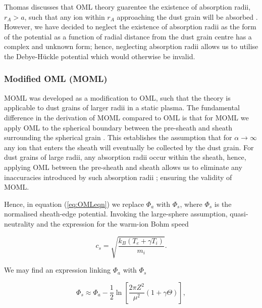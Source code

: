 \documentclass[journal]{Imperial_lab_report}
\begin{document}
\smallskip

Thomas discusses that OML theory guarentee the existence of absorption radii, $r_{A} > a$, such that any ion within $r_{A}$ approaching the dust grain will be absorbed \cite{Thomas}. However, we have decided to neglect the existence of absorption radii as the form of the potential as a function of radial distance from the dust grain centre has a complex and unknown form; hence, neglecting absorption radii allows us to utilise the Debye-Hückle potential which would otherwise be invalid.

\medskip

\subsubsection{Modified OML (MOML)}

\smallskip 

MOML was developed as a modification to OML, such that the theory is applicable to dust grains of larger radii in a static plasma. The fundamental difference in the derivation of MOML compared to OML is that for MOML we apply OML to the spherical boundary between the pre-sheath and sheath surrounding the spherical grain \cite{Thomas}. This establishes the assumption that for $\alpha \xrightarrow{} \infty $ any ion that enters the sheath will eventually be collected by the dust grain. For dust grains of large radii, any absorption radii occur within the sheath, hence, applying OML between the pre-sheath and sheath allows us to eliminate any inaccuracies introduced by such absorption radii \cite{Thomas} \cite{Willis}; ensuring the validity of MOML.

\smallskip

Hence, in equation (\ref{eq:OMLeqn}) we replace $\Phi_a$ with $\Phi_s$, where $\Phi_s$ is the normalised sheath-edge potential. Invoking the large-sphere assumption, quasi-neutrality and the expression for the warm-ion Bohm speed \cite{Thomas}

\begin{equation}\label{eq:WarmBohm}
c_{s} = \sqrt{\frac{k_{B}(T_{e} + \gamma T_{i})}{m_{i}}}.
\end{equation}

\noindent We may find an expression linking $\Phi_a$ with $\Phi_s$

\begin{equation}\label{eq:PhiS}
\Phi_s \approx \Phi_a - \frac{1}{2}\ln{\left[\frac{2\pi Z^2}{\mu^2}(1 + \gamma \Theta)\right]},
\end{equation}
\end{document}
